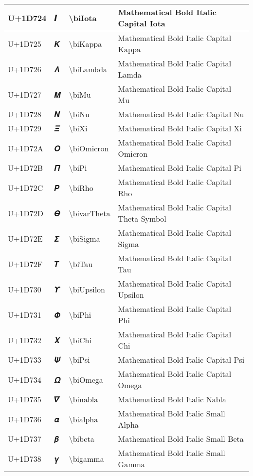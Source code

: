 \begin{table}[h]
\begin{tabulary}{\linewidth}{|L|L|L|L|}
\hline
U+1D724 & 𝜤 & {\textbackslash}biIota & Mathematical Bold Italic Capital Iota \\
\hline
U+1D725 & 𝜥 & {\textbackslash}biKappa & Mathematical Bold Italic Capital Kappa \\
\hline
U+1D726 & 𝜦 & {\textbackslash}biLambda & Mathematical Bold Italic Capital Lamda \\
\hline
U+1D727 & 𝜧 & {\textbackslash}biMu & Mathematical Bold Italic Capital Mu \\
\hline
U+1D728 & 𝜨 & {\textbackslash}biNu & Mathematical Bold Italic Capital Nu \\
\hline
U+1D729 & 𝜩 & {\textbackslash}biXi & Mathematical Bold Italic Capital Xi \\
\hline
U+1D72A & 𝜪 & {\textbackslash}biOmicron & Mathematical Bold Italic Capital Omicron \\
\hline
U+1D72B & 𝜫 & {\textbackslash}biPi & Mathematical Bold Italic Capital Pi \\
\hline
U+1D72C & 𝜬 & {\textbackslash}biRho & Mathematical Bold Italic Capital Rho \\
\hline
U+1D72D & 𝜭 & {\textbackslash}bivarTheta & Mathematical Bold Italic Capital Theta Symbol \\
\hline
U+1D72E & 𝜮 & {\textbackslash}biSigma & Mathematical Bold Italic Capital Sigma \\
\hline
U+1D72F & 𝜯 & {\textbackslash}biTau & Mathematical Bold Italic Capital Tau \\
\hline
U+1D730 & 𝜰 & {\textbackslash}biUpsilon & Mathematical Bold Italic Capital Upsilon \\
\hline
U+1D731 & 𝜱 & {\textbackslash}biPhi & Mathematical Bold Italic Capital Phi \\
\hline
U+1D732 & 𝜲 & {\textbackslash}biChi & Mathematical Bold Italic Capital Chi \\
\hline
U+1D733 & 𝜳 & {\textbackslash}biPsi & Mathematical Bold Italic Capital Psi \\
\hline
U+1D734 & 𝜴 & {\textbackslash}biOmega & Mathematical Bold Italic Capital Omega \\
\hline
U+1D735 & 𝜵 & {\textbackslash}binabla & Mathematical Bold Italic Nabla \\
\hline
U+1D736 & 𝜶 & {\textbackslash}bialpha & Mathematical Bold Italic Small Alpha \\
\hline
U+1D737 & 𝜷 & {\textbackslash}bibeta & Mathematical Bold Italic Small Beta \\
\hline
U+1D738 & 𝜸 & {\textbackslash}bigamma & Mathematical Bold Italic Small Gamma \\

\end{tabulary}
\end{table}
